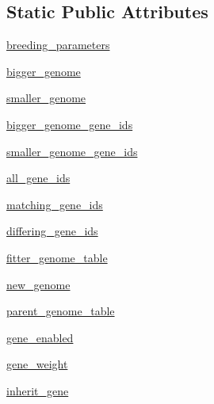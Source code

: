 \subsection*{Static Public Attributes}
\begin{DoxyCompactItemize}
\item 
\hyperlink{classNEAT__PyGenetics_1_1NEAT_1_1Generator_1_1Breeder_1_1Breeder_a0e28efbae8c7fdce0a0c0f1b7c7abe02}{breeding\+\_\+parameters}
\item 
\hyperlink{classNEAT__PyGenetics_1_1NEAT_1_1Generator_1_1Breeder_1_1Breeder_a4b2204333e2b891725b9d7eac0f9533b}{bigger\+\_\+genome}
\item 
\hyperlink{classNEAT__PyGenetics_1_1NEAT_1_1Generator_1_1Breeder_1_1Breeder_aee42ab257302cbcf2e6619111289c489}{smaller\+\_\+genome}
\item 
\hyperlink{classNEAT__PyGenetics_1_1NEAT_1_1Generator_1_1Breeder_1_1Breeder_aae86e270174a1ddc14677a5bd267ceda}{bigger\+\_\+genome\+\_\+gene\+\_\+ids}
\item 
\hyperlink{classNEAT__PyGenetics_1_1NEAT_1_1Generator_1_1Breeder_1_1Breeder_a1b7a43f5e5d325a0581e90e5666cc424}{smaller\+\_\+genome\+\_\+gene\+\_\+ids}
\item 
\hyperlink{classNEAT__PyGenetics_1_1NEAT_1_1Generator_1_1Breeder_1_1Breeder_aafd044323f51754e3d3ed1c56398b88b}{all\+\_\+gene\+\_\+ids}
\item 
\hyperlink{classNEAT__PyGenetics_1_1NEAT_1_1Generator_1_1Breeder_1_1Breeder_a017b63dcfc04f983f3097f52d1b2ba80}{matching\+\_\+gene\+\_\+ids}
\item 
\hyperlink{classNEAT__PyGenetics_1_1NEAT_1_1Generator_1_1Breeder_1_1Breeder_a3ef5f23263b2205639606d0c9756e79c}{differing\+\_\+gene\+\_\+ids}
\item 
\hyperlink{classNEAT__PyGenetics_1_1NEAT_1_1Generator_1_1Breeder_1_1Breeder_a6898cc6d6a36379227d5a00f9e627432}{fitter\+\_\+genome\+\_\+table}
\item 
\hyperlink{classNEAT__PyGenetics_1_1NEAT_1_1Generator_1_1Breeder_1_1Breeder_a8ecfda7d3fcfc166577e07cc977fa9cb}{new\+\_\+genome}
\item 
\hyperlink{classNEAT__PyGenetics_1_1NEAT_1_1Generator_1_1Breeder_1_1Breeder_a57dfe8e0f1eff1f6ef84492bc845dd40}{parent\+\_\+genome\+\_\+table}
\item 
\hyperlink{classNEAT__PyGenetics_1_1NEAT_1_1Generator_1_1Breeder_1_1Breeder_a11f9b1f5d4b9804dd8b54db956734938}{gene\+\_\+enabled}
\item 
\hyperlink{classNEAT__PyGenetics_1_1NEAT_1_1Generator_1_1Breeder_1_1Breeder_a1e14b916370fa769ae820893190a1f28}{gene\+\_\+weight}
\item 
\hyperlink{classNEAT__PyGenetics_1_1NEAT_1_1Generator_1_1Breeder_1_1Breeder_a82bb0cf6761460a4478abd22fc41e256}{inherit\+\_\+gene}
\end{DoxyCompactItemize}



